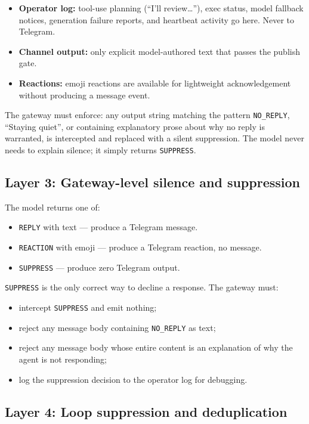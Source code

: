\documentclass[11pt]{article}
\begin{document}
\begin{itemize}
\item \textbf{Operator log:} tool-use planning (``I'll review\dots''), exec
status, model fallback notices, generation failure reports, and heartbeat
activity go here.  Never to Telegram.
\item \textbf{Channel output:} only explicit model-authored text that passes
the publish gate.
\item \textbf{Reactions:} emoji reactions are available for lightweight
acknowledgement without producing a message event.
\end{itemize}

The gateway must enforce: any output string matching the pattern
\texttt{NO\_REPLY}, ``Staying quiet'', or containing explanatory prose about
why no reply is warranted, is intercepted and replaced with a silent
suppression.  The model never needs to explain silence; it simply returns
\texttt{SUPPRESS}.

\subsection{Layer 3: Gateway-level silence and suppression}

The model returns one of:
\begin{itemize}
\item \texttt{REPLY} with text --- produce a Telegram message.
\item \texttt{REACTION} with emoji --- produce a Telegram reaction, no message.
\item \texttt{SUPPRESS} --- produce zero Telegram output.
\end{itemize}

\texttt{SUPPRESS} is the only correct way to decline a response.  The
gateway must:
\begin{itemize}
\item intercept \texttt{SUPPRESS} and emit nothing;
\item reject any message body containing \texttt{NO\_REPLY} as text;
\item reject any message body whose entire content is an explanation of why
the agent is not responding;
\item log the suppression decision to the operator log for debugging.
\end{itemize}

\subsection{Layer 4: Loop suppression and deduplication}
\end{document}
